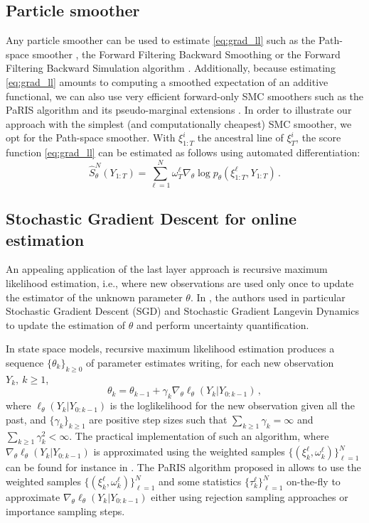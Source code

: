 \documentclass[journal]{IEEEtran}
\begin{document}
\subsection{Particle smoother}
Any particle smoother can be used to estimate \eqref{eq:grad_ll} such as the Path-space smoother \cite{Kitagawa1996}, the Forward Filtering Backward Smoothing \cite{Doucet2000OnSM} or the Forward Filtering Backward Simulation algorithm \cite{Godsill2004MonteCS}.
Additionally, because estimating \eqref{eq:grad_ll} amounts to computing a smoothed expectation of an additive functional, we can also use very efficient forward-only SMC smoothers such as the PaRIS algorithm and its pseudo-marginal extensions \cite{Olsson2014EfficientPO,gloaguen2022pseudo}.
In order to illustrate our approach with the simplest (and computationally cheapest) SMC smoother, we opt for the Path-space smoother.
With $\xi^i_{1:T}$ the ancestral line of $\xi^i_{T}$, the score function \eqref{eq:grad_ll} can be estimated as follows using automated differentiation:
$$
	\widehat {S}^N_\theta(Y_{1:T}) = \sum_{\ell=1}^N \omega_T^\ell\nabla_\theta\log p_\theta(\xi^\ell_{1:T}, Y_{1:T})\,.
$$

\subsection{Stochastic Gradient Descent for online estimation}
An appealing application of the last layer approach is recursive maximum likelihood estimation, i.e., where new observations are used only once to update the estimator of the unknown parameter $\theta$. In \cite{Brosse2020OnLA}, the authors used in particular Stochastic Gradient Descent (SGD) and Stochastic Gradient Langevin Dynamics to update the estimation of $\theta$ and perform uncertainty quantification.

In state space models, recursive maximum likelihood estimation produces a sequence $\lbrace\theta_k\rbrace_{k\geq 0}$ of parameter estimates writing, for each new observation $Y_{k},~k\geq 1$,
$$
	\theta_{k} = \theta_{k-1} + \gamma_k \nabla_\theta \ell_{\theta}(Y_k | Y_{0:k - 1}) \,,
$$
where $\ell_{\theta}(Y_k | Y_{0:k - 1})$ is the loglikelihood for the new observation given all the past, and $\lbrace\gamma_k\rbrace_{k\geq 1}$ are positive step sizes such that $\sum_{k \geq 1}\gamma_k = \infty$ and $\sum_{k \geq 1}\gamma_k^2 < \infty$. The practical implementation of such an algorithm, where $\nabla_\theta\ell_{\theta}(Y_k | Y_{0:k - 1})$ is approximated using the weighted samples $\{(\xi^{\ell}_k,\omega^{\ell}_k)\}_{\ell=1}^N$ can be found for instance in \cite{gloaguen2022pseudo}. The PaRIS algorithm proposed in \cite{Olsson2014EfficientPO} allows to use the weighted samples $\{(\xi^{\ell}_k,\omega^{\ell}_k)\}_{\ell=1}^N$ and some statistics $\{\tau^{\ell}_k\}_{\ell=1}^N$ on-the-fly to approximate $\nabla_\theta \ell_{\theta}(Y_k | Y_{0:k - 1})$ either using rejection sampling approaches or importance sampling steps.
\end{document}
